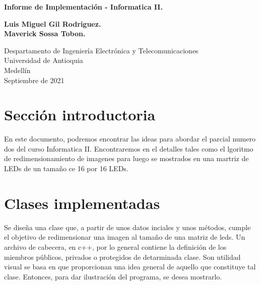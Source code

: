 \documentclass{article}
\begin{document}
\begin{titlepage}
    \begin{center}
        \vspace*{1cm}
            
        \Huge
        \textbf{Informe de Implementación - Informatica II.}
            
        \vspace{0.5cm}
        \LARGE
            
        \vspace{1.5cm}
            
        \textbf{Luis Miguel Gil Rodriguez.}
        \\
        \textbf{Maverick Sossa Tobon.}
        \vfill
        \vspace{0.8cm}
            
        \Large
        Despartamento de Ingeniería Electrónica y Telecomunicaciones\\
        Universidad de Antioquia\\
        Medellín\\
        Septiembre de 2021
            
    \end{center}
\end{titlepage}
\tableofcontents
\newpage
\section{Sección introductoria} \label{intro}
En este documento, podremos encontrar las ideas para abordar el parcial numero dos del curso Informatica II. Encontraremos en el detalles tales como el lgoritmo de redimensionamiento de imagenes para luego se mostrados en una martriz de LEDs de un tamaño ce 16 por 16 LEDs.

\section{Clases implementadas} \label{clases implementadas}
Se diseña una clase que, a partir de unos datos inciales y unos métodos, cumple el objetivo de redimensionar una imagen al tamaño de una matriz de leds. 
Un archivo de cabecera, en c++, por lo general contiene la definición de los miembros públicos, privados o protegidos de detarminada clase. Son utilidad visual se basa en que proporcionan una idea general de aquello que constituye tal clase. Entonces, para dar ilustración del programa, se desea mostrarlo. 
\end{document}
